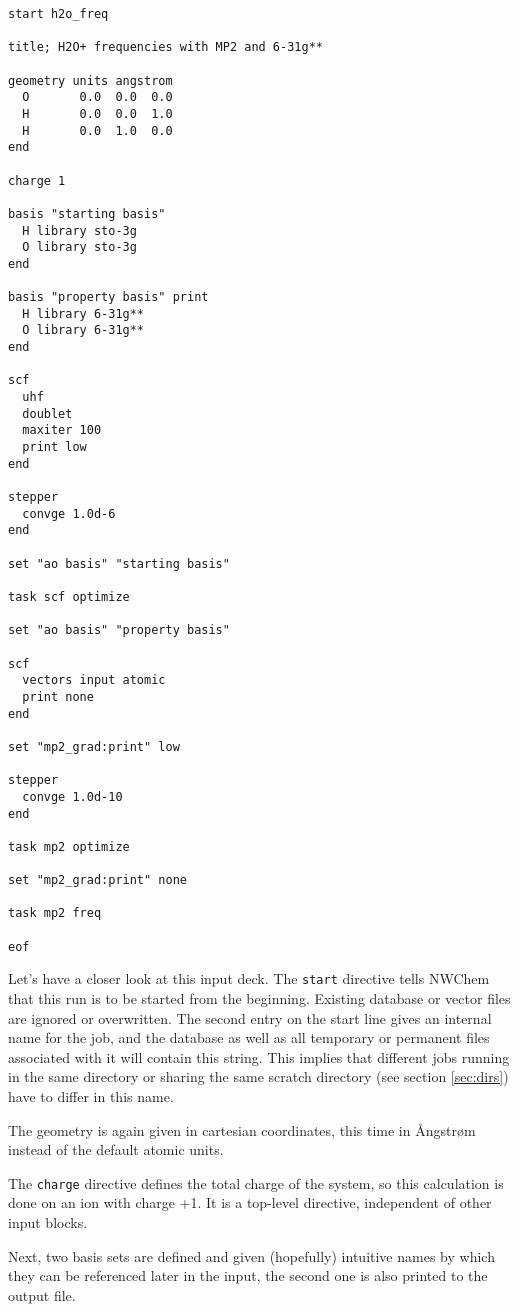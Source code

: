 \begin{verbatim}
start h2o_freq

title; H2O+ frequencies with MP2 and 6-31g**

geometry units angstrom
  O       0.0  0.0  0.0
  H       0.0  0.0  1.0
  H       0.0  1.0  0.0
end

charge 1

basis "starting basis"
  H library sto-3g
  O library sto-3g
end

basis "property basis" print
  H library 6-31g**
  O library 6-31g**
end

scf
  uhf
  doublet
  maxiter 100
  print low
end

stepper
  convge 1.0d-6
end

set "ao basis" "starting basis"

task scf optimize

set "ao basis" "property basis"

scf
  vectors input atomic
  print none
end

set "mp2_grad:print" low

stepper
  convge 1.0d-10
end

task mp2 optimize

set "mp2_grad:print" none

task mp2 freq

eof
\end{verbatim}

Let's have a closer look at this input deck. The {\tt start} directive
tells NWChem that this run is to be started from the
beginning. Existing database or vector files are ignored or
overwritten. The second entry on the start line gives an internal name
for the job, and the database as well as all temporary or permanent
files associated with it will contain this string. This implies that
different jobs running in the same directory or sharing the same
scratch directory (see section \ref{sec:dirs}) have to differ in this
name.

The geometry is again given in cartesian coordinates, this time in
{\AA}ngstr{\o}m instead of the default atomic units.

The {\tt charge} directive defines the total charge of the system, so
this calculation is done on an ion with charge +1. It is a top-level
directive, independent of other input blocks.

Next, two basis sets are defined and given (hopefully) intuitive names
by which they can be referenced later in the input, the second one is
also printed to the output file.

